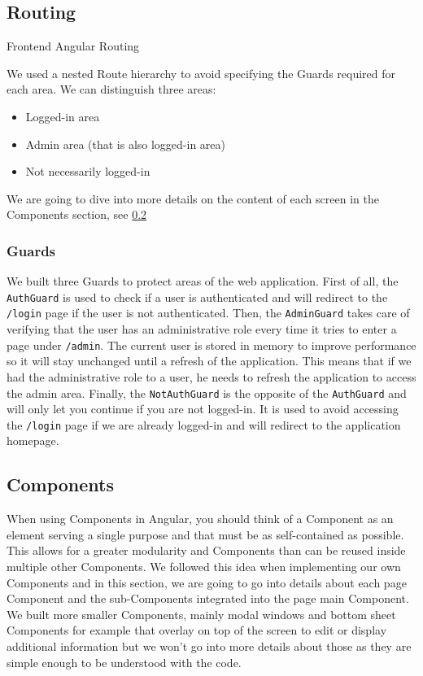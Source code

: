 \documentclass[twoside, openright,11pt,a4paper]{book}
\newenvironment{code}{\captionsetup{type=listing}}{}
\begin{document}
\subsection{Routing}
\begin{code}
	\caption{Frontend Angular Routing}
\end{code}
We used a nested Route hierarchy to avoid specifying the Guards required for each area. We can distinguish three areas:
\begin{itemize}
	\item Logged-in area
	\item Admin area (that is also logged-in area)
	\item Not necessarily logged-in
\end{itemize}
We are going to dive into more details on the content of each screen in the Components section, see \ref{component_implementation}
\subsubsection{Guards}
\label{guards_implementation}
We built three Guards to protect areas of the web application. First of all, the \verb+AuthGuard+ is used to check if a user is authenticated and will redirect to the \verb+/login+ page if the user is not authenticated. Then, the \verb+AdminGuard+ takes care of verifying that the user has an administrative role every time it tries to enter a page under \verb+/admin+. The current user is stored in memory to improve performance so it will stay unchanged until a refresh of the application. This means that if we had the administrative role to a user, he needs to refresh the application to access the admin area. Finally, the \verb+NotAuthGuard+ is the opposite of the \verb+AuthGuard+ and will only let you continue if you are not logged-in. It is used to avoid accessing the \verb+/login+ page if we are already logged-in and will redirect to the application homepage.

\subsection{Components}
\label{component_implementation}
When using Components in Angular, you should think of a Component as an element serving a single purpose and that must be as self-contained as possible. This allows for a greater modularity and Components than can be reused inside multiple other Components. We followed this idea when implementing our own Components and in this section, we are going to go into details about each page Component and the sub-Components integrated into the page main Component. We built more smaller Components, mainly modal windows and bottom sheet Components for example that overlay on top of the screen to edit or display additional information but we won't go into more details about those as they are simple enough to be understood with the code.
\end{document}
